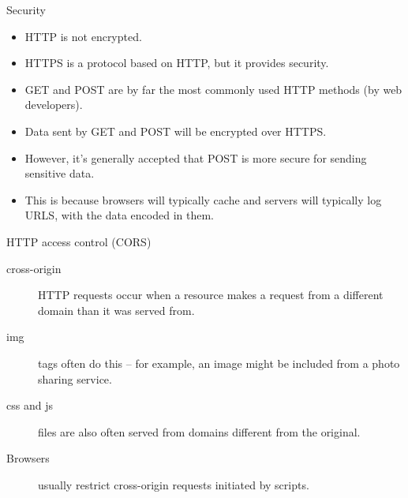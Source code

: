 \begin{frame}{Security}
  \begin{itemize}
    \item HTTP is not encrypted.
    \item HTTPS is a protocol based on HTTP, but it provides security.
    \item GET and POST are by far the most commonly used HTTP methods (by web developers).
    \item Data sent by GET and POST will be encrypted over HTTPS.
    \item However, it's generally accepted that POST is more secure for sending sensitive data.
    \item This is because browsers will typically cache and servers will typically log URLS, with the data encoded in them.
  \end{itemize}
\end{frame}



\begin{frame}[fragile]{HTTP access control (CORS)}
  \begin{description}
    \item[cross-origin] HTTP requests occur when a resource makes a request from a different domain than it was served from.
    \item[img] tags often do this -- for example, an image might be included from a photo sharing service.
    \item[css and js] files are also often served from domains different from the original.
    \item[Browsers] usually restrict cross-origin requests initiated by scripts.
  \end{description}
\end{frame}
